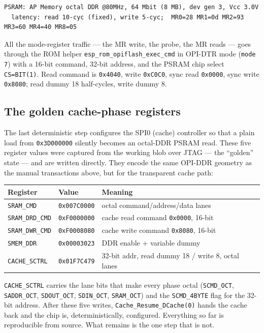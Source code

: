 \begin{lstlisting}[style=sh]
PSRAM: AP Memory octal DDR @80MHz, 64 Mbit (8 MB), dev gen 3, Vcc 3.0V
  latency: read 10-cyc (fixed), write 5-cyc;  MR0=28 MR1=0d MR2=93 MR3=60 MR4=40 MR8=05
\end{lstlisting}

All the mode-register traffic --- the MR write, the probe, the MR reads --- goes
through the ROM helper \texttt{esp\_rom\_opiflash\_exec\_cmd} in OPI-DTR mode
(\texttt{mode 7}) with a 16-bit command, 32-bit address, and the PSRAM chip select
\texttt{CS=BIT(1)}. Read command is \texttt{0x4040}, write \texttt{0xC0C0}, sync read
\texttt{0x0000}, sync write \texttt{0x8080}; read dummy 18 half-cycles, write dummy 8.

\subsection{The golden cache-phase registers}

The last deterministic step configures the SPI0 (cache) controller so that a plain
load from \texttt{0x3D000000} silently becomes an octal-DDR PSRAM read. These five
register values were captured from the working blob over JTAG --- the ``golden''
state --- and are written directly. They encode the same OPI-DDR geometry as the
manual transactions above, but for the transparent cache path:

\begin{longtable}{p{2.6cm} p{2.4cm} p{6.8cm}}
\toprule
\textbf{Register} & \textbf{Value} & \textbf{Meaning} \\ \midrule
\endhead
\texttt{SRAM\_CMD}  & \texttt{0x007C0000} & octal command/address/data lanes \\
\texttt{SRAM\_DRD\_CMD} & \texttt{0xF0000000} & cache read command \texttt{0x0000}, 16-bit \\
\texttt{SRAM\_DWR\_CMD} & \texttt{0xF0008080} & cache write command \texttt{0x8080}, 16-bit \\
\texttt{SMEM\_DDR}  & \texttt{0x00003023} & DDR enable + variable dummy \\
\texttt{CACHE\_SCTRL} & \texttt{0x01F7C479} & 32-bit addr, read dummy 18 / write 8, octal lanes \\
\bottomrule
\end{longtable}

\texttt{CACHE\_SCTRL} carries the lane bits that make every phase octal
(\texttt{SCMD\_OCT}, \texttt{SADDR\_OCT}, \texttt{SDOUT\_OCT}, \texttt{SDIN\_OCT},
\texttt{SRAM\_OCT}) and the \texttt{SCMD\_4BYTE} flag for the 32-bit address. After
these five writes, \texttt{Cache\_Resume\_DCache(0)} hands the cache back and the
chip is, deterministically, configured. Everything so far is reproducible from
source. What remains is the one step that is not.

